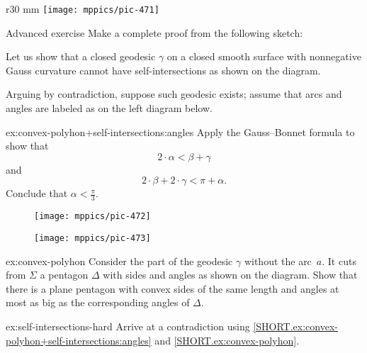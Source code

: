 \begin{wrapfigure}[4]{r}{30 mm}
\vskip-7mm
\centering
\texttt{[image: mppics/pic-471]}
\end{wrapfigure}

\begin{thm}{Advanced exercise}\label{ex:convex-polyhon+self-intersections}
Make a complete proof from the following sketch:

Let us show that a closed geodesic $\gamma$ on a closed smooth surface with nonnegative Gauss curvature cannot have self-intersections as shown on the diagram.

Arguing by contradiction, suppose such geodesic exists;
assume that arcs and angles are labeled as on the left diagram below.

\begin{subthm}{ex:convex-polyhon+self-intersections:angles}
Apply the Gauss--Bonnet formula to show that
\[2\cdot\alpha<\beta+\gamma\]
and 
\[2\cdot\beta+2\cdot \gamma<\pi+\alpha.\]
Conclude that $\alpha <\tfrac \pi 3$.
\end{subthm}

\begin{figure}[!ht]
\begin{minipage}{.38\textwidth}
\centering
\texttt{[image: mppics/pic-472]}
\end{minipage}\hfill
\begin{minipage}{.58\textwidth}
\centering
\texttt{[image: mppics/pic-473]}
\end{minipage}
\end{figure}

\begin{subthm}{ex:convex-polyhon}
Consider the part of the geodesic $\gamma$ without the arc~$a$.
It cuts from $\Sigma$ a pentagon $\Delta$ with sides and angles as shown on the diagram. 
Show that there is a plane pentagon with convex sides of the same length and angles at most as big as the corresponding angles of $\Delta$.
\end{subthm}

\begin{subthm}{ex:self-intersections-hard}
Arrive at a contradiction using \ref{SHORT.ex:convex-polyhon+self-intersections:angles} and \ref{SHORT.ex:convex-polyhon}. 
\end{subthm}

\end{thm}
